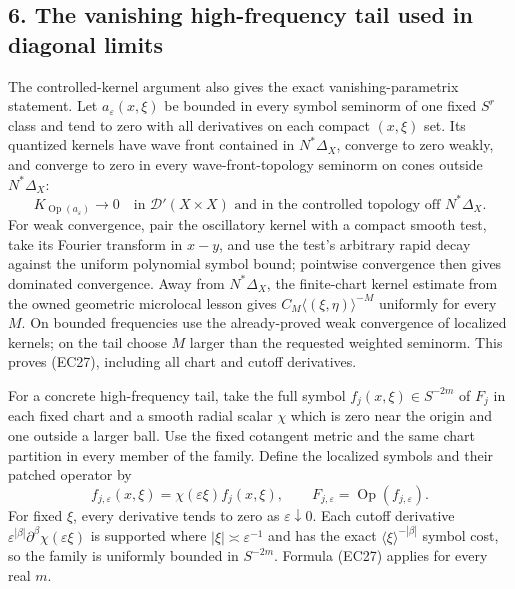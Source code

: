 \documentclass[
  11pt,
]{article}
\begin{document}
\subsection{6. The vanishing high-frequency tail used in diagonal
limits}\label{the-vanishing-high-frequency-tail-used-in-diagonal-limits}

The controlled-kernel argument also gives the exact vanishing-parametrix
statement. Let \(a_\varepsilon(x,\xi)\) be bounded in every symbol
seminorm of one fixed \(S^r\) class and tend to zero with all
derivatives on each compact \((x,\xi)\) set. Its quantized kernels have
wave front contained in \(N^*\Delta_X\), converge to zero weakly, and
converge to zero in every wave-front-topology seminorm on cones outside
\(N^*\Delta_X\): \[
 K_{\operatorname{Op}(a_\varepsilon)}
 \longrightarrow0
 \quad\text{in }\mathcal D'(X\times X)
 \text{ and in the controlled topology off }N^*\Delta_X.
 \tag{EC27}
\] For weak convergence, pair the oscillatory kernel with a compact
smooth test, take its Fourier transform in \(x-y\), and use the test's
arbitrary rapid decay against the uniform polynomial symbol bound;
pointwise convergence then gives dominated convergence. Away from
\(N^*\Delta_X\), the finite-chart kernel estimate from the owned
geometric microlocal lesson gives \(C_M\langle(\xi,\eta)\rangle^{-M}\)
uniformly for every \(M\). On bounded frequencies use the already-proved
weak convergence of localized kernels; on the tail choose \(M\) larger
than the requested weighted seminorm. This proves (EC27), including all
chart and cutoff derivatives.

For a concrete high-frequency tail, take the full symbol
\(f_j(x,\xi)\in S^{-2m}\) of \(F_j\) in each fixed chart and a smooth
radial scalar \(\chi\) which is zero near the origin and one outside a
larger ball. Use the fixed cotangent metric and the same chart partition
in every member of the family. Define the localized symbols and their
patched operator by \[
 f_{j,\varepsilon}(x,\xi)
   =\chi(\varepsilon\xi)f_j(x,\xi),\qquad
 F_{j,\varepsilon}=\operatorname{Op}(f_{j,\varepsilon}).
 \tag{EC28}
\] For fixed \(\xi\), every derivative tends to zero as
\(\varepsilon\downarrow0\). Each cutoff derivative
\(\varepsilon^{|\beta|}\partial^\beta\chi(\varepsilon\xi)\) is supported
where \(|\xi|\asymp\varepsilon^{-1}\) and has the exact
\(\langle\xi\rangle^{-|\beta|}\) symbol cost, so the family is uniformly
bounded in \(S^{-2m}\). Formula (EC27) applies for every real \(m\).
\end{document}
